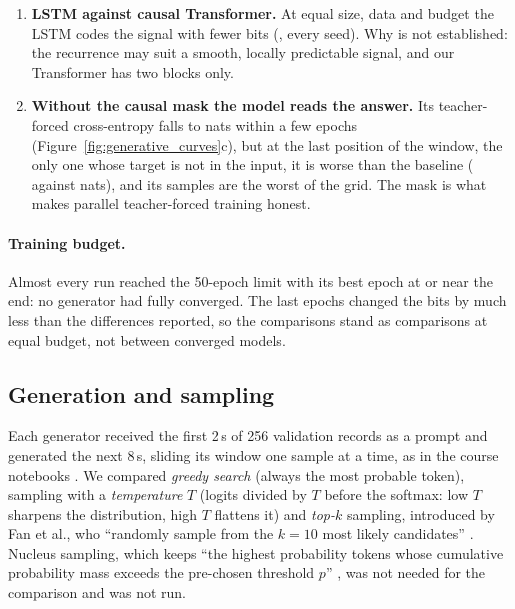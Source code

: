\begin{enumerate}[leftmargin=1.4em,itemsep=2pt]
        signal, a small model and a fixed budget), and the explanation of our result is a hypothesis:
        to use the previous beat, the model needs to know how far back it was.
  \item \textbf{LSTM against causal Transformer.} At equal size, data and budget the LSTM codes the
        signal with fewer bits (\generativeDiffMeanLstm{}, every seed). Why is not established: the
        recurrence may suit a smooth, locally predictable signal, and our Transformer has two blocks only.
  \item \textbf{Without the causal mask the model reads the answer.} Its teacher-forced cross-entropy
        falls to \generativeCeMeanNoMask{} nats within a few epochs (Figure~\ref{fig:generative_curves}c),
        but at the last position of the window, the only one whose target is not in the input, it is
        worse than the baseline (\generativeCeLastMeanNoMask{} against \generativeCeLastMeanBase{} nats),
        and its samples are the worst of the grid. The mask is what makes parallel teacher-forced training
        honest.
\end{enumerate}




\paragraph{Training budget.} Almost every run reached the 50-epoch limit with its best epoch at or near
the end: no generator had fully converged. The last epochs changed the bits by much less than the
differences reported, so the comparisons stand as comparisons at equal budget, not between converged
models.

\subsection{Generation and sampling}

Each generator received the first 2\,s of 256 validation records as a prompt and generated the next
8\,s, sliding its window one sample at a time, as in the course notebooks \cite{course_nb_sampling}.
We compared \emph{greedy search} (always the most probable token), sampling with a \emph{temperature}
$T$ (logits divided by $T$ before the softmax: low $T$ sharpens the distribution, high $T$ flattens it)
and \emph{top-$k$} sampling, introduced by Fan et al., who ``randomly sample from the $k = 10$ most
likely candidates'' \cite[p.~893]{fan2018hierarchical}. Nucleus sampling, which keeps ``the highest
probability tokens whose cumulative probability mass exceeds the pre-chosen threshold $p$''
\cite[p.~5]{holtzman2020curious}, was not needed for the comparison and was not run.

